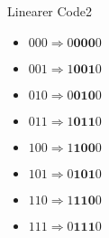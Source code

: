 \begin{aufgabe}{Linearer Code}{2}
\begin{enumerate}[label=\alph*)]
    \begin{multicols}{3}
        \begin{itemize}[label=]\narrowitems
            \item \(000 \Rightarrow 0\mathbf{000}0\)
            \item \(001 \Rightarrow 1\mathbf{001}0\)
            \item \(010 \Rightarrow 0\mathbf{010}0\)
            \item \(011 \Rightarrow 1\mathbf{011}0\)
            \item \(100 \Rightarrow 1\mathbf{100}0\)
            \item \(101 \Rightarrow 0\mathbf{101}0\)
            \item \(110 \Rightarrow 1\mathbf{110}0\)
            \item \(111 \Rightarrow 0\mathbf{111}0\)
        \end{itemize}
    \end{multicols}
\end{enumerate}
\end{aufgabe}\newpage
